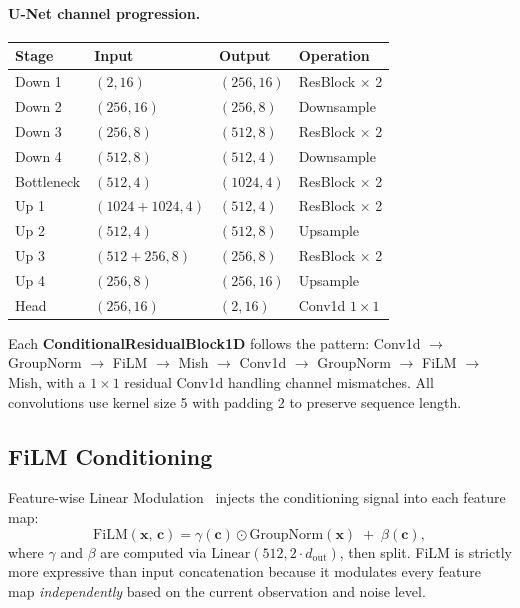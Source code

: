 \documentclass[10pt,letterpaper]{article}
\begin{document}
\paragraph{U-Net channel progression.}
\vspace{2pt}
\begin{center}
\small
\begin{tabular}{@{}llll@{}}
  \toprule
  \textbf{Stage} & \textbf{Input} & \textbf{Output} & \textbf{Operation} \\
  \midrule
  Down 1 & $(2, 16)$ & $(256, 16)$ & ResBlock $\times$ 2 \\
  Down 2 & $(256, 16)$ & $(256, 8)$  & Downsample \\
  Down 3 & $(256, 8)$  & $(512, 8)$  & ResBlock $\times$ 2 \\
  Down 4 & $(512, 8)$  & $(512, 4)$  & Downsample \\
  Bottleneck & $(512, 4)$ & $(1024, 4)$ & ResBlock $\times$ 2 \\
  Up 1   & $(1024{+}1024, 4)$ & $(512, 4)$ & ResBlock $\times$ 2 \\
  Up 2   & $(512, 4)$  & $(512, 8)$  & Upsample \\
  Up 3   & $(512{+}256, 8)$  & $(256, 8)$ & ResBlock $\times$ 2 \\
  Up 4   & $(256, 8)$  & $(256, 16)$ & Upsample \\
  Head   & $(256, 16)$ & $(2, 16)$   & Conv1d $1{\times}1$ \\
  \bottomrule
\end{tabular}
\end{center}
\vspace{4pt}

Each \textbf{ConditionalResidualBlock1D} follows the pattern:
Conv1d $\to$ GroupNorm $\to$ FiLM $\to$ Mish $\to$ Conv1d $\to$ GroupNorm $\to$ FiLM $\to$ Mish,
with a $1{\times}1$ residual Conv1d handling channel mismatches.
All convolutions use kernel size 5 with padding 2 to preserve sequence length.

\subsection{FiLM Conditioning}

Feature-wise Linear Modulation~\citep{perez2018film} injects the conditioning
signal into each feature map:
\begin{equation}
  \text{FiLM}(\mathbf{x},\, \mathbf{c})
  = \gamma(\mathbf{c}) \odot \text{GroupNorm}(\mathbf{x})
  \;+\; \beta(\mathbf{c}),
  \label{eq:film}
\end{equation}
where $\gamma$ and $\beta$ are computed via
$\text{Linear}(512, 2 \cdot d_{\text{out}})$, then split.
FiLM is strictly more expressive than input concatenation because it modulates
every feature map \emph{independently} based on the current observation and noise
level.
\end{document}
